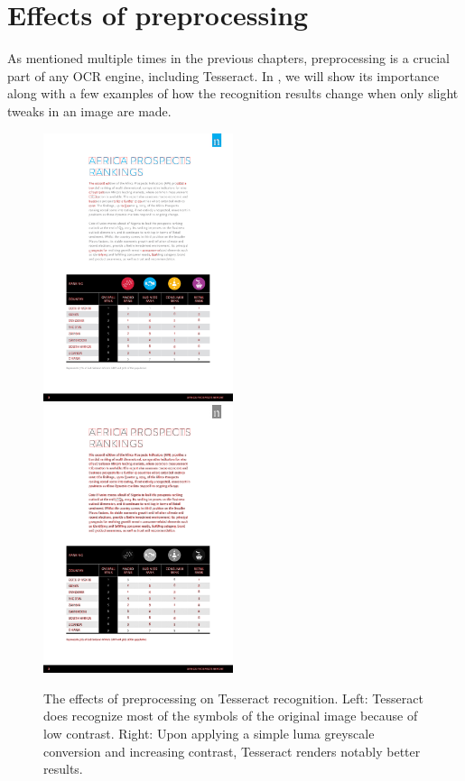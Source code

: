 \section{Effects of preprocessing}

As mentioned multiple times in the previous chapters, preprocessing is a crucial part of any OCR engine, including Tesseract. In , we will show its importance along with a few examples of how the recognition results change when only slight tweaks in an image are made.

\begin{figure}[t]
\centering

\includegraphics[width=15em]{img/results/im1_noPreproc.png}
\includegraphics[width=15em]{img/results/im1_Preproc.png}

\caption{The effects of preprocessing on Tesseract recognition. Left: Tesseract does recognize most of the symbols of the original image because of low contrast. Right: Upon applying a simple luma greyscale conversion and increasing contrast, Tesseract renders notably better results.}
\label{fig:preprocessEffects}
\end{figure}

